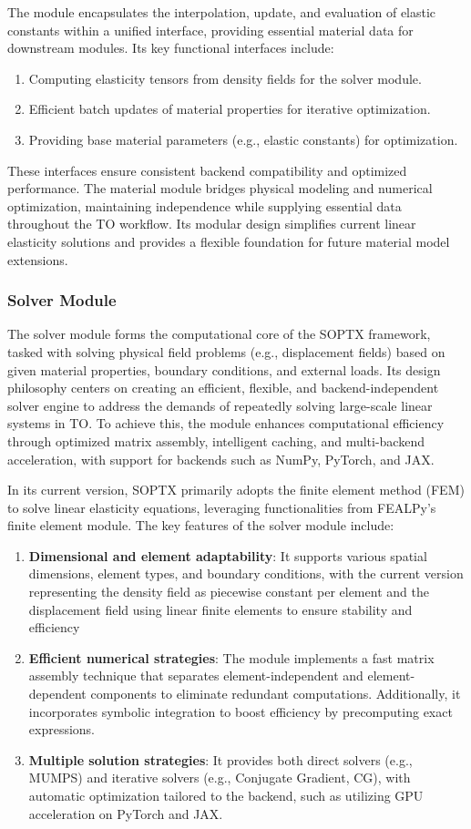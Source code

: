 \documentclass[mathpazo]{cicp}
\begin{document}
The module encapsulates the interpolation, update, and evaluation of elastic constants within a unified interface, providing essential material data for downstream modules. Its key functional interfaces include:
\begin{enumerate}
	\item Computing elasticity tensors from density fields for the solver module.
	\item Efficient batch updates of material properties for iterative optimization.
	\item Providing base material parameters (e.g., elastic constants) for optimization.
\end{enumerate}

These interfaces ensure consistent backend compatibility and optimized performance. The material module bridges physical modeling and numerical optimization, maintaining independence while supplying essential data throughout the TO workflow. Its modular design simplifies current linear elasticity solutions and provides a flexible foundation for future material model extensions.

\subsubsection{Solver Module}
The solver module forms the computational core of the SOPTX framework, tasked with solving physical field problems (e.g., displacement fields) based on given material properties, boundary conditions, and external loads. Its design philosophy centers on creating an efficient, flexible, and backend-independent solver engine to address the demands of repeatedly solving large-scale linear systems in TO. To achieve this, the module enhances computational efficiency through optimized matrix assembly, intelligent caching, and multi-backend acceleration, with support for backends such as NumPy, PyTorch, and JAX.

In its current version, SOPTX primarily adopts the finite element method (FEM) to solve linear elasticity equations, leveraging functionalities from FEALPy’s finite element module. The key features of the solver module include:
\begin{enumerate}
	\item \textbf{Dimensional and element adaptability}: It supports various spatial dimensions, element types, and boundary conditions, with the current version representing the density field as piecewise constant per element and the displacement field using linear finite elements to ensure stability and efficiency
	\item \textbf{Efficient numerical strategies}: The module implements a fast matrix assembly technique that separates element-independent and element-dependent components to eliminate redundant computations. Additionally, it incorporates symbolic integration to boost efficiency by precomputing exact expressions.
	\item \textbf{Multiple solution strategies}: It provides both direct solvers (e.g., MUMPS) and iterative solvers (e.g., Conjugate Gradient, CG), with automatic optimization tailored to the backend, such as utilizing GPU acceleration on PyTorch and JAX.
\end{enumerate}
\end{document}
